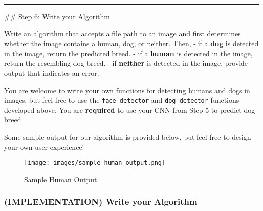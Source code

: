 \documentclass[11pt]{article}
\makeatletter
\def\maxwidth{\ifdim\Gin@nat@width>\linewidth\linewidth
    \else\Gin@nat@width\fi}
\let\Oldincludegraphics\includegraphics
\renewcommand{\includegraphics}[1]{\Oldincludegraphics[width=.8\maxwidth]{#1}}
\makeatother
\begin{document}
    \begin{center}\rule{0.5\linewidth}{\linethickness}\end{center}

 \#\# Step 6: Write your Algorithm

Write an algorithm that accepts a file path to an image and first
determines whether the image contains a human, dog, or neither. Then, -
if a \textbf{dog} is detected in the image, return the predicted breed.
- if a \textbf{human} is detected in the image, return the resembling
dog breed. - if \textbf{neither} is detected in the image, provide
output that indicates an error.

You are welcome to write your own functions for detecting humans and
dogs in images, but feel free to use the \texttt{face\_detector} and
\texttt{dog\_detector} functions developed above. You are
\textbf{required} to use your CNN from Step 5 to predict dog breed.

Some sample output for our algorithm is provided below, but feel free to
design your own user experience!

\begin{figure}
\centering
\texttt{[image: images/sample\_human\_output.png]}
\caption{Sample Human Output}
\end{figure}

\hypertarget{implementation-write-your-algorithm}{%
\subsubsection{(IMPLEMENTATION) Write your
Algorithm}\label{implementation-write-your-algorithm}}
\end{document}
